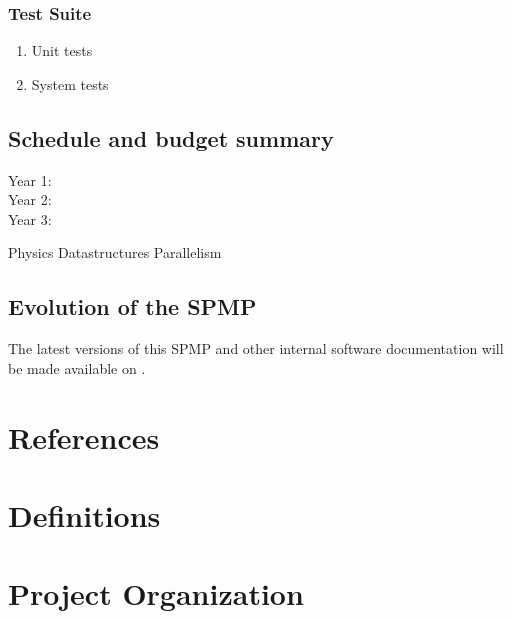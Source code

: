 \documentclass{article}[12pt]
\begin{document}
\subsubsection{Test Suite}
\begin{enumerate}
\item Unit tests
\item System tests
\end{enumerate}

\subsection{Schedule and budget summary}


\begin{description}
\item [Year 1: ]
\item [Year 2: ]
\item [Year 3: ]
\end{description}

Physics
Datastructures
Parallelism

\subsection{Evolution of the SPMP}

The latest versions of this SPMP and other internal software
documentation will be made available on
.


\section{References} \label{s:references}


\section{Definitions} \label{s:Definitions}
\section{Project Organization} \label{s:organization}
\end{document}
